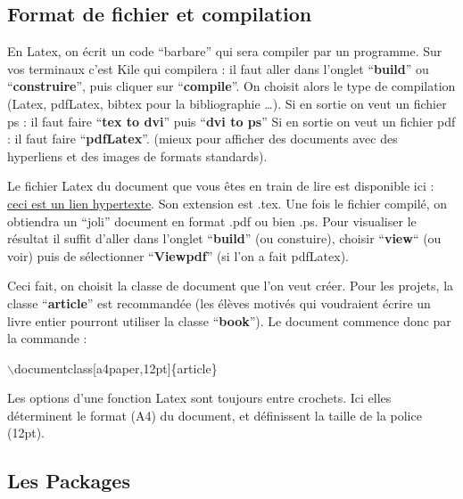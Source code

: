 \documentclass[11pt]{article}
\theoremstyle{remark}
\theoremstyle{definition}
\begin{document}

\subsection{Format de fichier et compilation}





En Latex, on écrit un code ``barbare'' qui sera compiler par un programme. Sur vos terminaux c'est Kile qui compilera : il faut aller dans l'onglet ``\textbf{build}'' ou ``\textbf{construire}'', puis cliquer sur ``\textbf{compile}''. On choisit alors le type de compilation (Latex, pdfLatex, bibtex pour la bibliographie \ldots).
Si en sortie on veut un fichier ps : il faut faire ``\textbf{tex to dvi}'' puis  ``\textbf{dvi to ps}''
Si en sortie on veut un fichier pdf : il faut faire ``\textbf{pdfLatex}''. (mieux pour afficher des documents avec des hyperliens et des images de formats standards).

Le fichier Latex du document que vous êtes en train de lire est  disponible ici : \href{ http://josephsalmon.eu/enseignement/M1/introlatex.tex}{ceci est un lien hypertexte}.  Son extension est  .tex. Une fois le fichier compilé,  on obtiendra un ``joli'' document en format .pdf ou bien .ps. Pour visualiser le résultat il suffit d'aller dans l'onglet  ``\textbf{build}'' (ou constuire), choisir ``\textbf{view}`` (ou voir) puis de sélectionner ``\textbf{Viewpdf}'' (si l'on a fait pdfLatex).\medskip

Ceci fait, on choisit la classe de document  que l'on veut créer.  Pour les projets,  la classe ``\textbf{article}'' est recommandée (les élèves motivés qui voudraient écrire un livre entier pourront utiliser la classe ``\textbf{book}''). Le document commence donc par la commande :\medskip

$\backslash$documentclass[a4paper,12pt]\{article\}\medskip

Les options d'une fonction Latex sont toujours entre crochets. Ici elles déterminent le format (A4) du document, et définissent la taille de la police (12pt).\medskip


\subsection{Les Packages}
\end{document}
